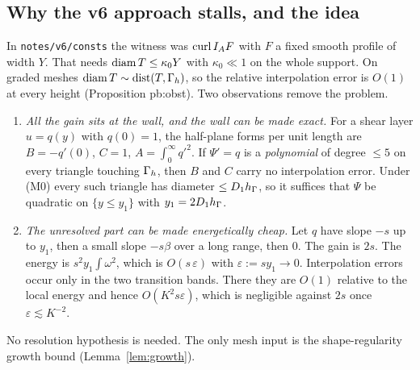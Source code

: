 \documentclass[11pt]{article}
\theoremstyle{remark}\newtheorem{remark}[theorem]{Remark}
\DeclareMathOperator{\dist}{dist}
\begin{document}
\subsection{Why the v6 approach stalls, and the idea}
In \texttt{notes/v6/consts} the witness was $\operatorname{curl} I_AF$ with $F$ a fixed smooth profile of width $Y$. That needs
$\operatorname{diam} T\le\kappa_0Y$ with $\kappa_0\ll1$ on the whole support. On graded meshes $\diam T\sim\dist(T,\Gh)$, so the relative
interpolation error is $O(1)$ at every height (Proposition pb:obst). Two observations remove the problem.
\begin{enumerate}[label=(\alph*)]
\item \emph{All the gain sits at the wall, and the wall can be made exact.} For a shear layer $u=q(y)$ with $q(0)=1$, the
  half-plane forms per unit length are $B=-q'(0)$, $C=1$, $A=\int_0^\infty q'^2$. If $\Psi'=q$ is a \emph{polynomial} of
  degree $\le5$ on every triangle touching $\Gamma_h$, then $B$ and $C$ carry no interpolation error. Under (M0) every such
  triangle has diameter $\le D_1h_\Gamma$, so it suffices that $\Psi$ be quadratic on $\{y\le y_1\}$ with $y_1=2D_1h_\Gamma$.
\item \emph{The unresolved part can be made energetically cheap.} Let $q$ have slope $-s$ up to $y_1$, then a small slope
  $-s\beta$ over a long range, then $0$. The gain is $2s$. The energy is $s^2y_1\int\omega^2$, which is $O(s\,\varepsilon)$
  with $\varepsilon:=sy_1\to0$. Interpolation errors occur only in the two transition bands. There they are $O(1)$ relative
  to the local energy and hence $O(K^2s\varepsilon)$, which is negligible against $2s$ once $\varepsilon\lesssim K^{-2}$.
\end{enumerate}
No resolution hypothesis is needed. The only mesh input is the shape-regularity growth bound (Lemma~\ref{lem:growth}).
\end{document}
